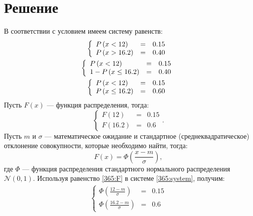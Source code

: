 \documentclass[12pt,a4paper]{article}
\begin{document}
    \section*{Решение}
    В соответствии с условием имеем систему равенств:
    \begin{gather}
        \left \{
        \begin{array}{lcl}
            P \left ( x < 12 \right )   & = & 0.15 \\
            P \left ( x > 16.2 \right ) & = & 0.40
        \end{array}
        \right . \\
        \left \{
        \begin{array}{lcl}
            P \left ( x < 12 \right )         & = & 0.15 \\
            1 - P \left ( x \le 16.2 \right ) & = & 0.40
        \end{array}
        \right . \\
        \left \{
        \begin{array}{lcl}
            P \left ( x < 12 \right )     & = & 0.15 \\
            P \left ( x \le 16.2 \right ) & = & 0.60
        \end{array}
        \right .
    \end{gather}
    Пусть $F(x)$ --- функция распределения, тогда:
    \begin{equation}
        \label{365:system}
        \left \{
        \begin{array}{lcl}
            F(12)   & = & 0.15 \\
            F(16.2) & = & 0.6
        \end{array}
        \right .
        .
    \end{equation}
    Пусть $m$ и $\sigma$ --- математическое ожидание и стандартное (среднеквадратическое) отклонение совокупности, которые необходимо найти, тогда:
    \begin{equation}
        \label{365:F}
        F(x) = \Phi \left ( \frac{x - m}{\sigma} \right ),
    \end{equation}
    где $\Phi$ --- функция распределения стандартного нормального распределения $\mathcal{N}(0, 1)$. Используя равенство \eqref{365:F} в системе \eqref{365:system}, получим:
    \begin{gather}
        \left \{
        \begin{array}{lcl}
            \Phi \left ( \frac{12-m}{\sigma} \right )   & = & 0.15 \\
            \Phi \left ( \frac{16.2-m}{\sigma} \right ) & = & 0.6
        \end{array}
        \right .
    \end{gather}
\end{document}
